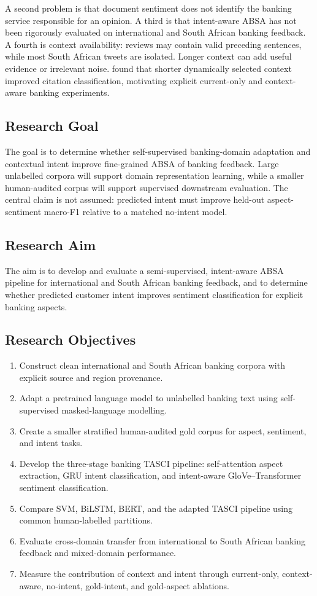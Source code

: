 \documentclass[11pt,a4paper]{article}
\begin{document}
A second problem is that document sentiment does not identify the banking service responsible for an opinion. A third is that intent-aware ABSA has not been rigorously evaluated on international and South African banking feedback. A fourth is context availability: reviews may contain valid preceding sentences, while most South African tweets are isolated. Longer context can add useful evidence or irrelevant noise. \citet{visser2022} found that shorter dynamically selected context improved citation classification, motivating explicit current-only and context-aware banking experiments.

\subsection{Research Goal}
The goal is to determine whether self-supervised banking-domain adaptation and contextual intent improve fine-grained ABSA of banking feedback. Large unlabelled corpora will support domain representation learning, while a smaller human-audited corpus will support supervised downstream evaluation. The central claim is not assumed: predicted intent must improve held-out aspect-sentiment macro-F1 relative to a matched no-intent model.

\subsection{Research Aim}
The aim is to develop and evaluate a semi-supervised, intent-aware ABSA pipeline for international and South African banking feedback, and to determine whether predicted customer intent improves sentiment classification for explicit banking aspects.

\subsection{Research Objectives}
\begin{enumerate}[label=\arabic*.]
\item Construct clean international and South African banking corpora with explicit source and region provenance.
\item Adapt a pretrained language model to unlabelled banking text using self-supervised masked-language modelling.
\item Create a smaller stratified human-audited gold corpus for aspect, sentiment, and intent tasks.
\item Develop the three-stage banking TASCI pipeline: self-attention aspect extraction, GRU intent classification, and intent-aware GloVe--Transformer sentiment classification.
\item Compare SVM, BiLSTM, BERT, and the adapted TASCI pipeline using common human-labelled partitions.
\item Evaluate cross-domain transfer from international to South African banking feedback and mixed-domain performance.
\item Measure the contribution of context and intent through current-only, context-aware, no-intent, gold-intent, and gold-aspect ablations.
\end{enumerate}
\end{document}
